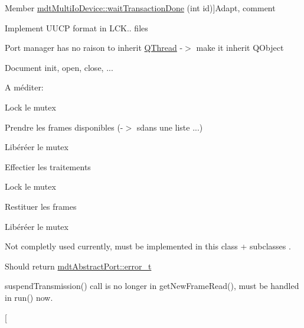 \begin{DoxyRefList}
\hypertarget{todo__todo000018}{}%
Member \hyperlink{classmdt_multi_io_device_a37a3f39a36b3bbd383f4f704193e3955}{mdt\-Multi\-Io\-Device\-:\-:wait\-Transaction\-Done} (int id)]Adapt, comment 
\item[\label{todo__todo000019}%
\hypertarget{todo__todo000019}{}%
Class \hyperlink{classmdt_port_lock}{mdt\-Port\-Lock} ]Implement U\-U\-C\-P format in L\-C\-K.. files  
\item[\label{todo__todo000029}%
\hypertarget{todo__todo000029}{}%
Class \hyperlink{classmdt_port_manager}{mdt\-Port\-Manager} ]Port manager has no raison to inherit \hyperlink{class_q_thread}{Q\-Thread} -\/$>$ make it inherit Q\-Object 

Document init, open, close, ... 
\item[\label{todo__todo000028}%
\hypertarget{todo__todo000028}{}%
Member \hyperlink{classmdt_port_manager_a4fcc8f0699b655156e661bb3de6056cc}{mdt\-Port\-Manager\-:\-:from\-Thread\-New\-Frame\-Readen} ()]A méditer\-:
\begin{DoxyItemize}
\item Lock le mutex
\item Prendre les frames disponibles (-\/$>$ sdans une liste ...)
\item Libéréer le mutex
\item Effectier les traitements
\item Lock le mutex
\item Restituer les frames
\item Libéréer le mutex  
\end{DoxyItemize}
\item[\label{todo__todo000031}%
\hypertarget{todo__todo000031}{}%
Member \hyperlink{classmdt_port_manager_a16c7ea5d74a8fc9ed065477574ec03c4}{mdt\-Port\-Manager\-:\-:last\-Error} () const ]Not completly used currently, must be implemented in this class + subclasses .  
\item[\label{todo__todo000032}%
\hypertarget{todo__todo000032}{}%
Member \hyperlink{classmdt_port_manager_aab594613e8985590c835194efbc27b5e}{mdt\-Port\-Manager\-:\-:open\-Port} ()]Should return \hyperlink{classmdt_abstract_port_ad4121bb930c95887e77f8bafa065a85e}{mdt\-Abstract\-Port\-::error\-\_\-t}  
\item[\label{todo__todo000034}%
\hypertarget{todo__todo000034}{}%
Class \hyperlink{classmdt_port_read_thread}{mdt\-Port\-Read\-Thread} ]suspend\-Transmission() call is no longer in get\-New\-Frame\-Read(), must be handled in run() now.  
\item[\label{todo__todo000035}%

\end{DoxyRefList}
